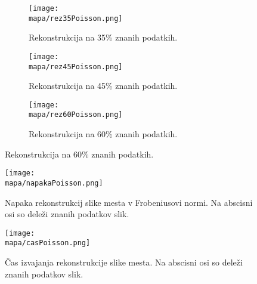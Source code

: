 \renewcommand{\mapa}{Poglavja/Slike/kompleksnost/kompleksna grayscale 300}

\begin{figure}[H]
    \begin{subfigure}{0.32\linewidth}
        \texttt{[image: \\mapa/rez35Poisson.png]}
        \caption{Rekonstrukcija na 35\% znanih podatkih.}
    \end{subfigure}
    \hfill
    \begin{subfigure}{0.32\linewidth}
        \texttt{[image: \\mapa/rez45Poisson.png]}
        \caption{Rekonstrukcija na 45\% znanih podatkih.}
    \end{subfigure}
    \hfill
    \begin{subfigure}{0.32\linewidth}
        \texttt{[image: \\mapa/rez60Poisson.png]}
        \caption{Rekonstrukcija na 60\% znanih podatkih.}
    \end{subfigure}
\end{figure}

\begin{figure}[H]
    \texttt{[image: \\mapa/napakaPoisson.png]}
    \caption{Napaka rekonstrukcij slike mesta v Frobeniusovi normi. Na abscisni osi so deleži znanih podatkov slik.}
\end{figure}

\begin{figure}[H]
    \texttt{[image: \\mapa/casPoisson.png]}
    \caption{Čas izvajanja rekonstrukcije slike mesta. Na abscisni osi so deleži znanih podatkov slik.}
\end{figure} 
